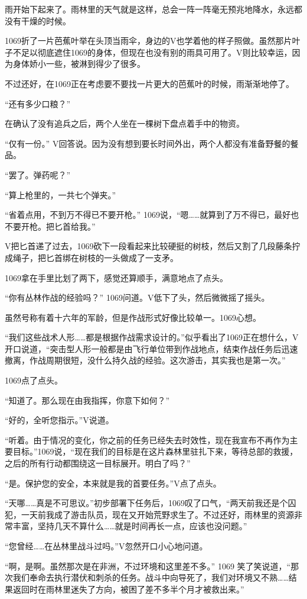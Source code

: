 雨开始下起来了。雨林里的天气就是这样，总会一阵一阵毫无预兆地降水，永远都没有干燥的时候。

1069折了一片芭蕉叶举在头顶当雨伞，身边的V也学着他的样子照做。虽然那片叶子不足以彻底遮住1069的身体，但现在也没有别的雨具可用了。V则比较幸运，因为身体娇小一些，被淋到得少了很多。

不过还好，在1069正在考虑要不要找一片更大的芭蕉叶的时候，雨渐渐地停了。

“还有多少口粮？”

在确认了没有追兵之后，两个人坐在一棵树下盘点着手中的物资。

“仅有一份。” V回答说。因为没有想到要长时间外出，两个人都没有准备野餐的餐品。

“罢了。弹药呢？”

“算上枪里的，一共七个弹夹。”

“省着点用，不到万不得已不要开枪。” 1069说，“嗯……就算到了万不得已，最好也不要开枪。把匕首给我。”

V把匕首递了过去，1069砍下一段看起来比较硬挺的树枝，然后又割了几段藤条拧成绳子，把匕首绑在树枝的一头做成了一支矛。

1069拿在手里比划了两下，感觉还算顺手，满意地点了点头。

“你有丛林作战的经验吗？” 1069问道。V低下了头，然后微微摇了摇头。

虽然号称有着十六年的军龄，但是作战形式好像比较单一。1069心想。

“我们这些战术人形……都是根据作战需求设计的。”似乎看出了1069正在想什么，V开口说道，“突击型人形一般都是由飞行单位带到作战地点，结束作战任务后迅速撤离，作战周期很短，没什么持久战的经验。这次游击，其实我也是第一次。”

1069点了点头。

“知道了。那么现在由我指挥，你意下如何？”

“好的，全听您指示。”V说道。

“听着。由于情况的变化，你之前的任务已经失去时效性，现在我宣布不再作为主要目标。”1069说，“现在我们的目标是在这片森林里驻扎下来，等待总部的救援，之后的所有行动都围绕这一目标展开。明白了吗？”

“是。保护您的安全，本来就是我的首要任务。”V点了点头。

“天哪……真是不可思议。”初步部署下任务后，1069叹了口气，“两天前我还是个囚犯，一天前我成了游击队员，现在又开始荒野求生了。不过还好，雨林里的资源非常丰富，坚持几天不算什么……就是时间再长一点，应该也没问题。”

“您曾经……在丛林里战斗过吗。”V忽然开口小心地问道。

“啊，是啊。虽然那次是在非洲，不过环境和这里差不多。” 1069 笑了笑说道，“那次我们奉命去执行潜伏和刺杀的任务。战斗中向导死了，我们对环境又不熟……结果返回时在雨林里迷失了方向，被困了差不多半个月才被救出来。”

